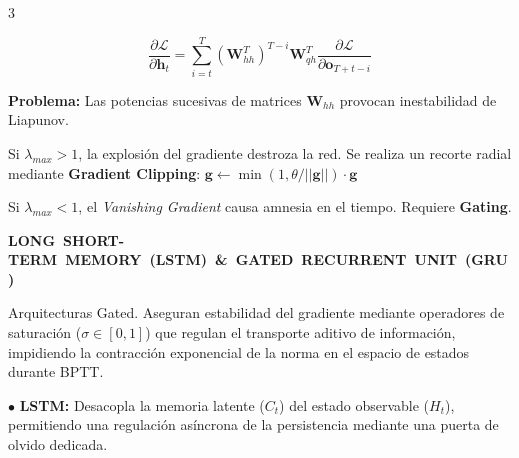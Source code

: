 \documentclass[8pt,a4paper,landscape,fleqn]{extarticle}
\begin{document}
\begin{multicols*}{3}
\begin{center}
\begin{minipage}{0.15\textwidth}
    \end{minipage}
    \begin{minipage}{0.15\textwidth}
        \centering
        $$ \frac{\partial \mathcal{L}}{\partial \bm{h}_t} = \sum_{i=t}^T (\bm{W}_{hh}^T)^{T-i} \bm{W}_{qh}^T \frac{\partial \mathcal{L}}{\partial \bm{o}_{T+t-i}} $$
    \end{minipage}
\end{center}

\vspace{-2mm}

\textbf{Problema:} Las potencias sucesivas de matrices $\bm{W}_{hh}$ provocan inestabilidad de Liapunov. 

Si $\lambda_{max} > 1$, la explosión del gradiente destroza la red.  Se realiza un recorte radial mediante \textbf{Gradient Clipping}: $ \bm{g} \leftarrow \min\left(1, \theta /{||\bm{g}||}\right) \cdot \bm{g} $

Si $\lambda_{max} < 1$, el \textit{Vanishing Gradient} causa amnesia en el tiempo. Requiere \textbf{Gating}.

\mbox{\textbf{LONG SHORT-TERM MEMORY (LSTM) \!\&\! GATED RECURRENT UNIT (GRU)}}

Arquitecturas Gated. Aseguran estabilidad del gradiente mediante operadores de saturación ($\sigma \in [0,1]$) que regulan el transporte aditivo de información, impidiendo la contracción exponencial de la norma en el espacio de estados durante BPTT.


$\bullet$ \textbf{LSTM:} Desacopla la memoria latente ($C_t$) del estado observable ($H_t$), permitiendo una regulación asíncrona de la persistencia mediante una puerta de olvido dedicada.
\begin{center}

\end{center}
\end{multicols*}
\end{document}
